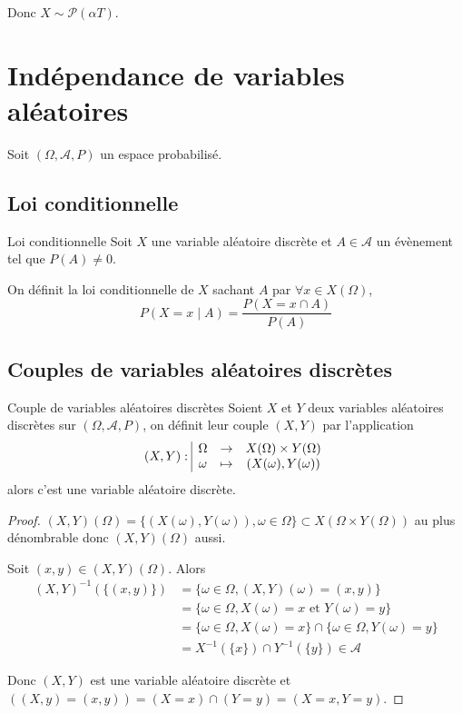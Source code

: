 Donc $X \sim \mathcal P(\alpha T)$. 

\section{Indépendance de variables aléatoires }

Soit $(\Omega, \mathcal A, P)$ un espace probabilisé.

\subsection{Loi conditionnelle}

\begin{definition}{Loi conditionnelle}{}
    Soit $X$ une variable aléatoire discrète et $A \in \mathcal A$ un évènement tel que $P(A) \neq 0$.

    On définit la loi conditionnelle de $X$ sachant $A$ par $\forall x \in X(\Omega)$,
    $$ P(X = x \mid A) = \frac{P(X = x \cap A)}{P(A)}$$
\end{definition}

\subsection{Couples de variables aléatoires discrètes }

\begin{theoreme}{Couple de variables aléatoires discrètes}{}
    Soient $X$ et $Y$ deux variables aléatoires discrètes sur $(\Omega, \mathcal A, P)$, on définit 
    leur couple $(X, Y)$ par l'application 
    $$(X, Y): \space \begin{array}{|ccc} \displaystyle \Omega & \to & \displaystyle X(\Omega) \times Y(\Omega) \\ \displaystyle \omega & \mapsto & \displaystyle (X(\omega), Y(\omega)) \end{array}$$
    alors c'est une variable aléatoire discrète.
\end{theoreme}

\begin{proof}
    $(X, Y)(\Omega) = \{(X(\omega), Y(\omega)), \omega \in \Omega \} \subset X(\Omega \times Y(\Omega))$ au plus dénombrable 
    donc $(X, Y)(\Omega)$ aussi. 

    Soit $(x, y) \in (X, Y)(\Omega)$. Alors 
    \begin{align}
        (X, Y)^{-1}(\{(x, y)\}) & = \{\omega \in \Omega, (X, Y)(\omega) = (x, y)\} \\
        & = \{\omega \in \Omega, X(\omega) = x \text{ et } Y(\omega) = y\} \\
        & = \{\omega \in \Omega, X(\omega) = x\} \cap \{\omega \in \Omega, Y(\omega) = y\} \\
        & = X^{-1}(\{x\}) \cap Y^{-1}(\{y\}) \in \mathcal A
    \end{align} 

    Donc $(X, Y)$ est une variable aléatoire discrète et $((X, y) = (x, y)) = (X = x) \cap (Y = y) = (X = x, Y = y)$.
\end{proof}

